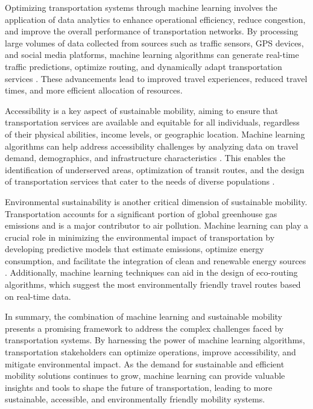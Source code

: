 Optimizing transportation systems through machine learning involves the application of data analytics to enhance operational efficiency, reduce congestion, and improve the overall performance of transportation networks. By processing large volumes of data collected from sources such as traffic sensors, GPS devices, and social media platforms, machine learning algorithms can generate real-time traffic predictions, optimize routing, and dynamically adapt transportation services \cite{anagnostopoulos2009predicting, dogra2022iot}. These advancements lead to improved travel experiences, reduced travel times, and more efficient allocation of resources.

Accessibility is a key aspect of sustainable mobility, aiming to ensure that transportation services are available and equitable for all individuals, regardless of their physical abilities, income levels, or geographic location. Machine learning algorithms can help address accessibility challenges by analyzing data on travel demand, demographics, and infrastructure characteristics \cite{de2021:ml:sustainable-transportation}. This enables the identification of underserved areas, optimization of transit routes, and the design of transportation services that cater to the needs of diverse populations \cite{cappelletti2022machine}.

Environmental sustainability is another critical dimension of sustainable mobility. Transportation accounts for a significant portion of global greenhouse gas emissions and is a major contributor to air pollution. Machine learning can play a crucial role in minimizing the environmental impact of transportation by developing predictive models that estimate emissions, optimize energy consumption, and facilitate the integration of clean and renewable energy sources \cite{castaneda2021:sustainable-transportation}. Additionally, machine learning techniques can aid in the design of eco-routing algorithms, which suggest the most environmentally friendly travel routes based on real-time data.

In summary, the combination of machine learning and sustainable mobility presents a promising framework to address the complex challenges faced by transportation systems. By harnessing the power of machine learning algorithms, transportation stakeholders can optimize operations, improve accessibility, and mitigate environmental impact. As the demand for sustainable and efficient mobility solutions continues to grow, machine learning can provide valuable insights and tools to shape the future of transportation, leading to more sustainable, accessible, and environmentally friendly mobility systems.


